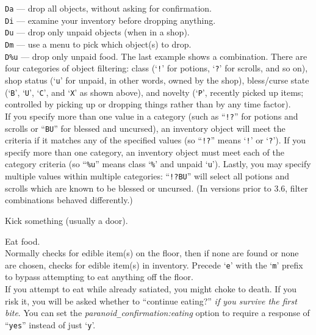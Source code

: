 {\tt Da}  --- drop all objects, without asking for confirmation.\\
{\tt Di}  --- examine your inventory before dropping anything.\\
{\tt Du}  --- drop only unpaid objects (when in a shop).\\
{\tt Dm}  --- use a menu to pick which object(s) to drop.\\
{\tt D\%u} --- drop only unpaid food.
The last example shows a combination.
There are four categories of object filtering: class (`{\tt !}' for
potions, `{\tt ?}' for scrolls, and so on), shop status (`{\tt u}' for
unpaid, in other words, owned by the shop), bless/curse state
(`{\tt B}', `{\tt U}', `{\tt C}', and `{\tt X}' as shown above),
and novelty (`{\tt P}', recently picked up items; controlled by picking
up or dropping things rather than by any time factor).
\\
If you specify more than one value in a category (such as ``{\tt !?}'' for
potions and scrolls or ``{\tt BU}'' for blessed and uncursed), an inventory
object will meet the criteria if it matches any of the specified
values (so ``{\tt !?}'' means `{\tt !}' or `{\tt ?}').
If you specify more than one category, an inventory object must meet
each of the category criteria (so ``{\tt \%u}'' means class `{\tt \%}' and
unpaid `{\tt u}').
Lastly, you may specify multiple values within multiple categories:
``{\tt !?BU}'' will select all potions and scrolls which are known to be
blessed or uncursed.
(In versions prior to 3.6, filter combinations behaved differently.)
\item[\tb{\^{}D}]
Kick something (usually a door).
\item[\tb{e}]
Eat food.\\
Normally checks for edible item(s) on the floor, then if none are found
or none are chosen, checks for edible item(s) in inventory.
Precede `{\tt e}' with the `{\tt m}' prefix to bypass attempting to eat
anything off the floor.\\
If you attempt to eat while already satiated, you might choke to death.
If you risk it, you will be asked whether
to ``continue eating?'' {\it if you survive the first bite\/}.
You can set the
{\it paranoid\verb+_+confirmation:eating\/}
option to require a response of ``{\tt yes}'' instead of just `{\tt y}'.
